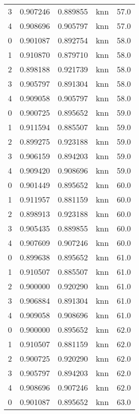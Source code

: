 \begin{tabular}{rrrlr}
     3 & 0.907246 & 0.889855 &      knn &       57.0 \\
     4 & 0.908696 & 0.905797 &      knn &       57.0 \\
     0 & 0.901087 & 0.892754 &      knn &       58.0 \\
     1 & 0.910870 & 0.879710 &      knn &       58.0 \\
     2 & 0.898188 & 0.921739 &      knn &       58.0 \\
     3 & 0.905797 & 0.891304 &      knn &       58.0 \\
     4 & 0.909058 & 0.905797 &      knn &       58.0 \\
     0 & 0.900725 & 0.895652 &      knn &       59.0 \\
     1 & 0.911594 & 0.885507 &      knn &       59.0 \\
     2 & 0.899275 & 0.923188 &      knn &       59.0 \\
     3 & 0.906159 & 0.894203 &      knn &       59.0 \\
     4 & 0.909420 & 0.908696 &      knn &       59.0 \\
     0 & 0.901449 & 0.895652 &      knn &       60.0 \\
     1 & 0.911957 & 0.881159 &      knn &       60.0 \\
     2 & 0.898913 & 0.923188 &      knn &       60.0 \\
     3 & 0.905435 & 0.889855 &      knn &       60.0 \\
     4 & 0.907609 & 0.907246 &      knn &       60.0 \\
     0 & 0.899638 & 0.895652 &      knn &       61.0 \\
     1 & 0.910507 & 0.885507 &      knn &       61.0 \\
     2 & 0.900000 & 0.920290 &      knn &       61.0 \\
     3 & 0.906884 & 0.891304 &      knn &       61.0 \\
     4 & 0.909058 & 0.908696 &      knn &       61.0 \\
     0 & 0.900000 & 0.895652 &      knn &       62.0 \\
     1 & 0.910507 & 0.881159 &      knn &       62.0 \\
     2 & 0.900725 & 0.920290 &      knn &       62.0 \\
     3 & 0.905797 & 0.894203 &      knn &       62.0 \\
     4 & 0.908696 & 0.907246 &      knn &       62.0 \\
     0 & 0.901087 & 0.895652 &      knn &       63.0 \\

\end{tabular}
